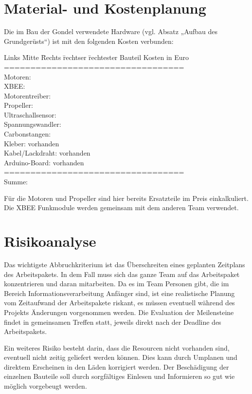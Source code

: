 \documentclass[lang=ngerman,inputenc=utf8,fontsize=10pt]{ldvarticle}
\begin{document}
\section{Material- und Kostenplanung}

Die im Bau der Gondel verwendete Hardware (vgl. Absatz „Aufbau des Grundgerüsts“) ist mit den folgenden Kosten verbunden:
\begin{tabbing}
Links \= Mitte \= Rechts \= rechtser \= rechtester \kill
Bauteil		\>\>\>\>		Kosten in Euro\\
==================================\\
Motoren:\>\>\>	\\
XBEE:	\>\>	\>\>		25\\
Motorentreiber:	\>\>\>\\
Propeller:		\>\>\>\>	5\\
Ultraschallsensor:\>\>\>\\
Spannungswandler:\>\>\>\\
Carbonstangen:	\>\>\>\\
Kleber:	\>\>	\>\>		vorhanden\\
Kabel/Lackdraht:\>\>\>\>	vorhanden\\
Arduino-Board:	\>\>\>\>	vorhanden\\
==================================\\
Summe:			\>\>\>\>	95\\
\end{tabbing}
Für die Motoren und Propeller sind hier bereits Ersatzteile im Preis einkalkuliert. Die XBEE Funkmodule werden gemeinsam mit dem anderen Team verwendet.

\section{Risikoanalyse}

Das wichtigste Abbruchkriterium ist das Überschreiten eines geplanten Zeitplans des Arbeitspakets. In dem Fall muss sich das ganze Team auf das Arbeitspaket konzentrieren und daran mitarbeiten. Da es im Team Personen gibt, die im Bereich Informationsverarbeitung Anfänger sind, ist eine realistische Planung vom Zeitaufwand der Arbeitspakete riskant, es müssen eventuell während des Projekts Änderungen vorgenommen werden. Die Evaluation der Meilensteine findet in gemeinsamen Treffen statt, jeweils direkt nach der Deadline des Arbeitspakets.


Ein weiteres Risiko besteht darin, dass die Resourcen nicht vorhanden sind, eventuell nicht zeitig geliefert werden können. Dies kann durch Umplanen und direktem Erscheinen in den Läden korrigiert werden. Der Beschädigung der einzelnen Bauteile soll durch sorgfältiges Einlesen und Informieren so gut wie möglich vorgebeugt werden.
\end{document}
